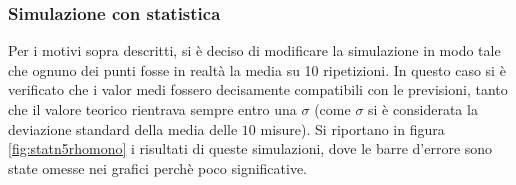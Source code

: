 \documentclass[a4paper,12pt,twoside,openright]{report}
\begin{document}
\subsubsection{Simulazione con statistica}
\label{subsubsec:5dimrhomonostat}
Per i motivi sopra descritti, si è deciso di modificare la simulazione in modo tale che ognuno dei punti fosse in realtà la media su 10 ripetizioni.
In questo caso si è verificato che i valor medi fossero decisamente compatibili con le previsioni, tanto che il valore teorico rientrava sempre entro una $ \sigma $ (come $ \sigma $ si è considerata la deviazione standard della media delle $ 10 $ misure).
Si riportano in figura \ref{fig:statn5rhomono} i risultati di queste simulazioni, dove le barre d'errore sono state omesse nei grafici perchè poco significative.
\begin{figure}[ht]
	\centering
	\newline

\end{figure}
\end{document}
